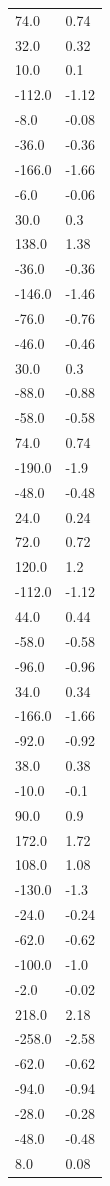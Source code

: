 \begin{longtable}{ll}
74.0 & 0.74 \\
32.0 & 0.32 \\
10.0 & 0.1 \\
-112.0 & -1.12 \\
-8.0 & -0.08 \\
-36.0 & -0.36 \\
-166.0 & -1.66 \\
-6.0 & -0.06 \\
30.0 & 0.3 \\
138.0 & 1.38 \\
-36.0 & -0.36 \\
-146.0 & -1.46 \\
-76.0 & -0.76 \\
-46.0 & -0.46 \\
30.0 & 0.3 \\
-88.0 & -0.88 \\
-58.0 & -0.58 \\
74.0 & 0.74 \\
-190.0 & -1.9 \\
-48.0 & -0.48 \\
24.0 & 0.24 \\
72.0 & 0.72 \\
120.0 & 1.2 \\
-112.0 & -1.12 \\
44.0 & 0.44 \\
-58.0 & -0.58 \\
-96.0 & -0.96 \\
34.0 & 0.34 \\
-166.0 & -1.66 \\
-92.0 & -0.92 \\
38.0 & 0.38 \\
-10.0 & -0.1 \\
90.0 & 0.9 \\
172.0 & 1.72 \\
108.0 & 1.08 \\
-130.0 & -1.3 \\
-24.0 & -0.24 \\
-62.0 & -0.62 \\
-100.0 & -1.0 \\
-2.0 & -0.02 \\
218.0 & 2.18 \\
-258.0 & -2.58 \\
-62.0 & -0.62 \\
-94.0 & -0.94 \\
-28.0 & -0.28 \\
-48.0 & -0.48 \\
8.0 & 0.08 \\

\end{longtable}

